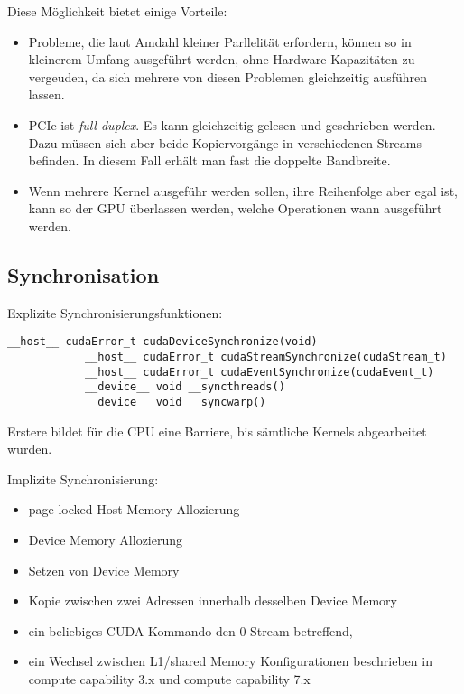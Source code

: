 		Diese Möglichkeit bietet einige Vorteile:
		\begin{itemize}
		\item Probleme, die laut Amdahl kleiner Parllelität erfordern, können so in kleinerem Umfang ausgeführt werden, ohne Hardware Kapazitäten zu vergeuden, da sich mehrere von diesen Problemen gleichzeitig ausführen lassen.
		\item PCIe ist \textit{full-duplex}. Es kann gleichzeitig gelesen und geschrieben werden. Dazu müssen sich aber beide Kopiervorgänge in verschiedenen Streams befinden. In diesem Fall erhält man fast die doppelte Bandbreite.
		\item Wenn mehrere \Gls{Kernel} ausgeführ werden sollen, ihre Reihenfolge aber egal ist, kann so der GPU überlassen werden, welche Operationen wann ausgeführt werden.
		\end{itemize}
		
		
		\subsection{Synchronisation}\label{sync}
		Explizite Synchronisierungsfunktionen:
		
		\begin{lstlisting}[caption=Explizite Synchronisierung]
			__host__ cudaError_t cudaDeviceSynchronize(void)
			__host__ cudaError_t cudaStreamSynchronize(cudaStream_t)
			__host__ cudaError_t cudaEventSynchronize(cudaEvent_t)	
			__device__ void __syncthreads()
			__device__ void __syncwarp()
		\end{lstlisting}
		Erstere bildet für die CPU eine Barriere, bis sämtliche Kernels abgearbeitet wurden.
		
		Implizite Synchronisierung:
		\begin{itemize}
        	\item page-locked Host Memory Allozierung
			\item Device Memory Allozierung
			\item Setzen von Device Memory 
			\item Kopie zwischen zwei Adressen innerhalb desselben Device Memory
			\item ein beliebiges CUDA Kommando den 0-\Gls{Stream} betreffend,
			\item ein Wechsel zwischen L1/\gls{shared Memory} Konfigurationen beschrieben in \gls{compute capability} 3.x und \gls{compute capability} 7.x
		\end{itemize}
		
